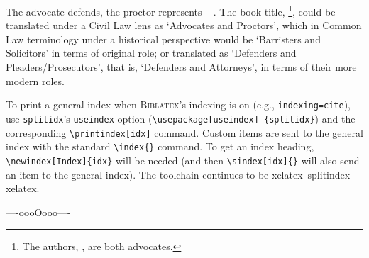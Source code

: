 \p The advocate defends, the proctor represents -- \cite[c 4, s 12; p 100]{aandp}. The book title, \footnote{The authors, \citeauthor{aandp}, are both advocates.}, could be translated under a Civil Law lens as `Advocates and Proctors', which in Common Law terminology under a historical perspective would be `Barristers and Solicitors' in terms of original role;  or translated as `Defenders and Pleaders/Prosecutors', that is, `Defenders and Attorneys', in terms of their more modern roles.

\p To print a general index when \textsc{Biblatex}'s indexing is on (e.g., \texttt{indexing=cite}), use \texttt{splitidx}'s \texttt{useindex} option (\texttt{\textbackslash usepackage[useindex] \{splitidx\}}) and the corresponding \texttt{\textbackslash printindex[idx]} command. Custom items are sent to the general index with the standard \texttt{\textbackslash index\{\}} command. To get an index heading, \texttt{\textbackslash newindex[Index]\{idx\}} will be needed (and then \texttt{\textbackslash sindex[idx]\{\}} will also send an item to the general index). The toolchain continues to be xelatex--splitindex--xelatex.

\printbibliography

\printindex[idx]

\bigskip
\bigskip
\hfill ----oooOooo---- \hfill\ 
